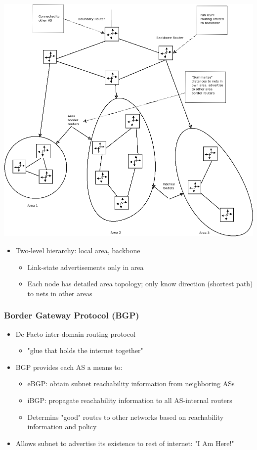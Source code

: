 \documentclass[11pt]{article}
\begin{document}
\begin{center}
\includegraphics[width=.9\linewidth]{../img/ospf.png}
\end{center}

\begin{itemize}
\item Two-level hierarchy: local area, backbone
\begin{itemize}
\item Link-state advertisements only in area
\item Each node has detailed area topology; only know direction
(shortest path) to nets in other areas
\end{itemize}
\end{itemize}

\subsubsection{Border Gateway Protocol (BGP)}
\label{sec:orgd007fd4}
\begin{itemize}
\item De Facto inter-domain routing protocol 
\begin{itemize}
\item "glue that holds the internet together"
\end{itemize}

\item BGP provides each AS a means to:
\begin{itemize}
\item eBGP: obtain subnet reachability information from neighboring ASs
\item iBGP: propagate reachability information to all AS-internal routers
\item Determins "good" routes to other networks based on reachability
information and policy
\end{itemize}
\item Allows subnet to advertise its existence to rest of internet: "I Am
Here!"
\end{itemize}
\end{document}
